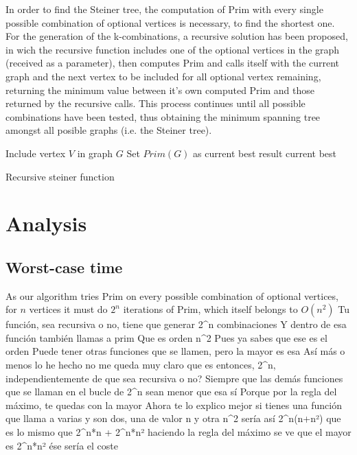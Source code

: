 \documentclass[a4paper]{article}
\begin{document}
    In order to find the Steiner tree, the computation of Prim with every single possible combination of optional vertices is necessary, to find the shortest one. For the generation of the k-combinations, a recursive solution has been proposed, in wich the recursive function includes one of the optional vertices in the graph (received as a parameter), then computes Prim and calls itself with the current graph and the next vertex to be included for all optional vertex remaining, returning the minimum value between it's own computed Prim and those returned by the recursive calls. This process continues until all possible combinations have been tested, thus obtaining the minimum spanning tree amongst all posible graphs (i.e. the Steiner tree).\newpage

\begin{algorithm}[H]
 Include vertex $V$ in graph $G$\;
 Set $Prim(G)$ as current best result \;
 \Return current best\;
 \caption{Recursive steiner function}
\end{algorithm}

    \section{Analysis}
        \subsection{Worst-case time}
            As our algorithm tries Prim on every possible combination of optional vertices, for $n$ vertices it must do $2^{n}$ iterations of Prim, which itself belongs to $O(n^2)$
            Tu función, sea recursiva o no, tiene que generar 2^n combinaciones
Y dentro de esa función también llamas a prim
Que es orden n^2
Pues ya sabes que ese es el orden
Puede tener otras funciones que se llamen, pero la mayor es esa
Así más o menos lo he hecho
no me queda muy claro
que es entonces, 2^n, independientemente de que sea recursiva o no?
Siempre que las demás funciones que se llaman en el bucle de 2^n sean menor que esa sí
Porque por la regla del máximo, te quedas con la mayor
Ahora te lo explico mejor
si tienes una función que llama a varias
y son dos, una de valor n y otra n^2
sería así
2^n(n+n²)
que es lo mismo que 2^n*n + 2^n*n²
haciendo la regla del máximo
se ve que el mayor es 2^n*n²
ése sería el coste
\end{document}
